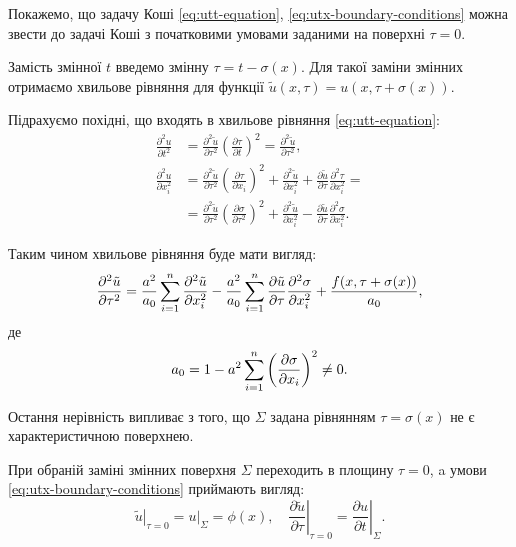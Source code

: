 Покажемо, що задачу Коші \eqref{eq:utt-equation}, \eqref{eq:utx-boundary-conditions} можна звести до задачі Коші з початковими умовами заданими на поверхні $\tau = 0$. \medskip

Замість змінної $t$ введемо змінну $\tau = t - \sigma(x)$. Для такої заміни змінних отримаємо хвильове рівняння для функції $\tilde u(x, \tau) = u(x, \tau + \sigma(x))$. \medskip

Підрахуємо похідні, що входять в хвильове рівняння \eqref{eq:utt-equation}:
\begin{align}
    \frac{\partial^2 u}{\partial t^2} &= \frac{\partial^2 \tilde u}{\partial \tau^2} \left( \frac{\partial \tau}{\partial t} \right)^2 =  \frac{\partial^2 \tilde u}{\partial \tau^2}, \\
    \frac{\partial^2 u}{\partial x_i^2} &= \frac{\partial^2 \tilde u}{\partial \tau^2} \left( \frac{\partial \tau}{\partial x_i} \right)^2 + \frac{\partial^2 \tilde u}{\partial x_i^2} + \frac{\partial \tilde u}{\partial \tau} \frac{\partial^2 \tau}{\partial x_i^2} = \\
    &= \frac{\partial^2 \tilde u}{\partial \tau^2} \left( \frac{\partial \sigma}{\partial \tau^2} \right)^2 + \frac{\partial^2 \tilde u}{\partial x_i^2} - \frac{\partial \tilde u}{\partial \tau} \frac{\partial^2 \sigma}{\partial x_i^2}. \nonumber
\end{align}

Таким чином хвильове рівняння буде мати вигляд:
\begin{equation}
    \frac{\partial^2 \tilde u}{\partial \tau^2} = \frac{a^2}{a_0} \displaystyle\sum\limits_{i = 1}^n \frac{\partial^2 \tilde u}{\partial x_i^2} - \frac{a^2}{a_0} \displaystyle\sum\limits_{i = 1}^n \frac{\partial \tilde u}{\partial \tau} \frac{\partial^2 \sigma}{\partial x_i^2} + \frac{f(x, \tau + \sigma(x))}{a_0},
\end{equation}
де
\begin{equation}
    a_0 = 1 - a^2 \displaystyle\sum\limits_{i = 1}^n \left( \frac{\partial \sigma}{\partial x_i} \right)^2 \ne 0.
\end{equation}

Остання нерівність випливає з того, що $\Sigma$ задана рівнянням $\tau = \sigma(x)$ не є характеристичною поверхнею. \medskip

При обраній заміні змінних поверхня $\Sigma$ переходить в площину $\tau = 0$, a умови \eqref{eq:utx-boundary-conditions} приймають вигляд:
\begin{equation}
    \label{eq:tilde-u-boundary-conditions}
    \left. \tilde u \right|_{\tau = 0} = \left. u \right|_\Sigma = \phi(x), \quad \left. \frac{\partial \tilde u}{\partial \tau} \right|_{\tau = 0} = \left. \frac{\partial u}{\partial t} \right|_\Sigma.
\end{equation}

